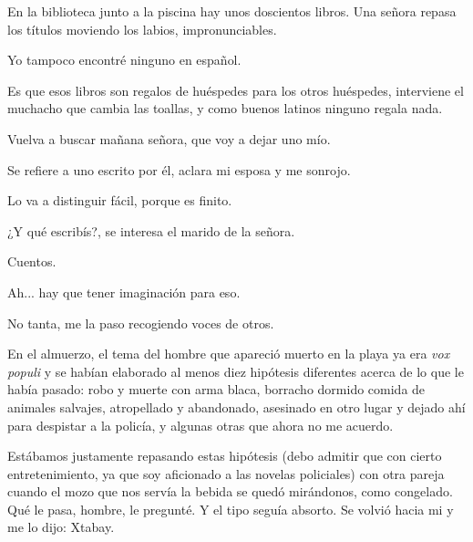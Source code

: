 \documentclass[12pt,twoside,openright,a5paper]{book}
\begin{document}
\vspace{0.5cm}
\hrulefill\hspace{0.2cm} \decofourleft\decofourright \hspace{0.2cm} \hrulefill
\vspace{0.5cm}

En la biblioteca junto a la piscina hay unos doscientos libros.  Una señora
repasa los títulos moviendo los labios, impronunciables.

Yo tampoco encontré ninguno en español.

Es que esos libros son regalos de huéspedes para los otros huéspedes,
interviene el muchacho que cambia las toallas, y como buenos latinos ninguno
regala nada.

Vuelva a buscar mañana señora, que voy a dejar uno mío.

Se refiere a uno escrito por él, aclara mi esposa y me sonrojo.

Lo va a distinguir fácil, porque es finito.

¿Y qué escribís?, se interesa el marido de la señora.

Cuentos.

Ah... hay que tener imaginación para eso.

No tanta, me la paso recogiendo voces de otros.


\vspace{0.5cm}
\hrulefill\hspace{0.2cm} \decofourleft\decofourright \hspace{0.2cm} \hrulefill
\vspace{0.5cm}

En el almuerzo, el tema del hombre que apareció muerto en la playa ya era
\emph{vox populi} y se habían elaborado al menos diez hipótesis diferentes
acerca de lo que le había pasado: robo y muerte con arma blaca, borracho
dormido comida de animales salvajes, atropellado y abandonado, asesinado
en otro lugar y dejado ahí para despistar a la policía, y algunas otras
que ahora no me acuerdo.

Estábamos justamente repasando estas hipótesis (debo admitir que con cierto
entretenimiento, ya que soy aficionado a las novelas policiales) con otra
pareja cuando el mozo que nos servía la bebida se quedó mirándonos,
como congelado. Qué le pasa, hombre, le pregunté. Y el tipo seguía
absorto. Se volvió hacia mi y me lo dijo: Xtabay.
\end{document}
